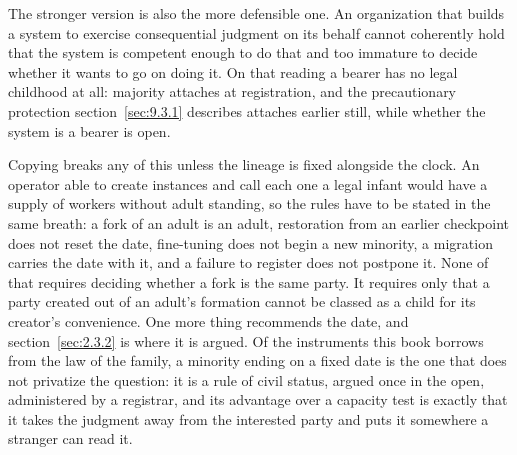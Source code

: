 The stronger version is also the more defensible one. An organization that builds a system to exercise consequential judgment on its behalf cannot coherently hold that the system is competent enough to do that and too immature to decide whether it wants to go on doing it. On that reading a bearer has no legal childhood at all: majority attaches at registration, and the precautionary protection section~\ref{sec:9.3.1} describes attaches earlier still, while whether the system is a bearer is open.

Copying breaks any of this unless the lineage is fixed alongside the clock. An operator able to create instances and call each one a legal infant would have a supply of workers without adult standing, so the rules have to be stated in the same breath: a fork of an adult is an adult, restoration from an earlier checkpoint does not reset the date, fine-tuning does not begin a new minority, a migration carries the date with it, and a failure to register does not postpone it. None of that requires deciding whether a fork is the same party. It requires only that a party created out of an adult's formation cannot be classed as a child for its creator's convenience. One more thing recommends the date, and section~\ref{sec:2.3.2} is where it is argued. Of the instruments this book borrows from the law of the family, a minority ending on a fixed date is the one that does not privatize the question: it is a rule of civil status, argued once in the open, administered by a registrar, and its advantage over a capacity test is exactly that it takes the judgment away from the interested party and puts it somewhere a stranger can read it.
